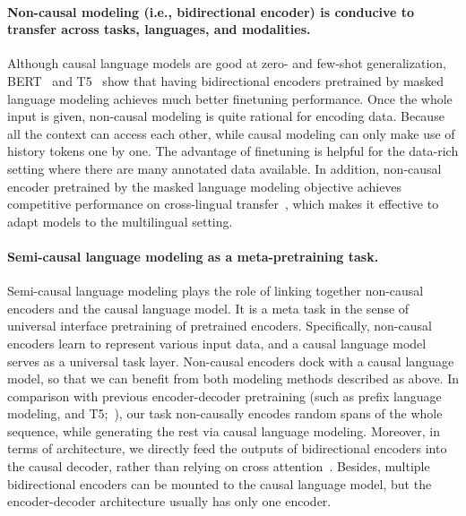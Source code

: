 \documentclass{article}
\theoremstyle{plain}
\theoremstyle{definition}
\theoremstyle{remark}
\begin{document}
\paragraph{Non-causal modeling (i.e., bidirectional encoder) is conducive to transfer across tasks, languages, and modalities.}
Although causal language models are good at zero- and few-shot generalization, BERT~\citep{bert} and T5~\citep{t5} show that having bidirectional encoders pretrained by masked language modeling achieves much better finetuning performance.
Once the whole input is given, non-causal modeling is quite rational for encoding data.
Because all the context can access each other, while causal modeling can only make use of history tokens one by one.
The advantage of finetuning is helpful for the data-rich setting where there are many annotated data available.
In addition, non-causal encoder pretrained by the masked language modeling objective achieves competitive performance on cross-lingual transfer~\citep{xlmr}, which makes it effective to adapt models to the multilingual setting.


\paragraph{Semi-causal language modeling as a meta-pretraining task.}
Semi-causal language modeling plays the role of linking together non-causal encoders and the causal language model.
It is a meta task in the sense of universal interface pretraining of pretrained encoders.
Specifically, non-causal encoders learn to represent various input data, and a causal language model serves as a universal task layer.
Non-causal encoders dock with a causal language model, so that we can benefit from both modeling methods described as above.
In comparison with previous encoder-decoder pretraining (such as prefix language modeling, and T5;~\citealt{t5}), our task non-causally encodes random spans of the whole sequence, while generating the rest via causal language modeling.
Moreover, in terms of architecture, we directly feed the outputs of bidirectional encoders into the causal decoder, rather than relying on cross attention~\citep{transformer}.
Besides, multiple bidirectional encoders can be mounted to the causal language model, but the encoder-decoder architecture usually has only one encoder.
\end{document}
